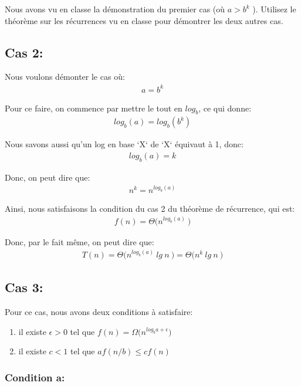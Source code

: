 \documentclass[12pt]{article}
\begin{document}
Nous avons vu en classe la démonstration du premier cas (où  \(a > b^k\)
).
Utilisez le théorème sur les récurrences vu en classe pour démontrer les
deux autres cas.


\subsection*{Cas 2:}

Nous voulons démonter le cas où:
\begin{align*}
	a = b^k
\end{align*}

\noindent Pour ce faire, on commence par mettre le tout en
\(  log_b\), ce qui donne:
\begin{align*}
	 log_b(a) = log_b(b^k)
\end{align*}

Nous savons aussi qu'un log en base `X` de `X` équivaut à 1, donc:
\begin{align*}
	 log_b(a) = k
\end{align*}

Donc, on peut dire que:
\begin{align*}
	 n^k = n^{log_b(a)}
\end{align*}

Ainsi, nous satisfaisons la condition du cas 2 du théorème de récurrence, qui est:
\begin{align*}
	f(n) = \Theta\big(n^{log_b(a)} \: \big)
\end{align*}

Donc, par le fait même, on peut dire que:
\begin{align*}
	T(n) = \Theta\big(n^{log_b(a)} \: lg \: n \: \big) = \Theta\big(n^k \: lg \: n \: \big)
\end{align*}


\subsection*{Cas 3:}

Pour ce cas, nous avons deux conditions à satisfaire:
    \begin{enumerate}[label=(\alph*)]
      \item  il existe \( \epsilon > 0 \) tel que \( f(n) = \Omega\big(n^{log_ba+\epsilon}  \big) \)
      \item il existe \( c < 1 \) tel que \(af(n/b) \leq cf(n) \)
    \end{enumerate}


\subsubsection*{Condition a:}
\end{document}
